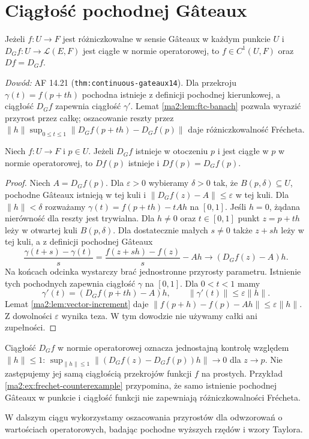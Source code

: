 \section{Ciągłość pochodnej Gâteaux}

\begin{twierdzenie}
\label{ma2:thm:continuous-gateaux}
Jeżeli $f:U\to F$ jest różniczkowalne w sensie
Gâteaux w każdym punkcie $U$ i
$D_Gf:U\to\mathcal L(E,F)$ jest ciągłe w normie
operatorowej, to $f\in C^1(U,F)$ oraz $Df=D_Gf$.
\end{twierdzenie}
\emph{Dowód:} AF 14.21 (\texttt{thm:continuous-gateaux14}).
Dla przekroju $\gamma(t)=f(p+th)$ pochodna istnieje
z definicji pochodnej kierunkowej, a ciągłość
$D_Gf$ zapewnia ciągłość $\gamma'$.
Lemat \ref{ma2:lem:ftc-banach} pozwala wyrazić
przyrost przez całkę; oszacowanie reszty przez
$\|h\|\sup_{0\le t\le1}\|D_Gf(p+th)-D_Gf(p)\|$
daje różniczkowalność Frécheta.

\begin{wniosek}
\label{ma2:cor:pointwise-gateaux}
Niech $f:U\to F$ i $p\in U$.
Jeżeli $D_Gf$ istnieje w otoczeniu $p$ i jest
ciągłe w $p$ w normie operatorowej, to $Df(p)$
istnieje i $Df(p)=D_Gf(p)$.
\end{wniosek}
\begin{proof}
Niech $A=D_Gf(p)$. Dla $\varepsilon>0$ wybieramy
$\delta>0$ tak, że $B(p,\delta)\subseteq U$,
pochodne Gâteaux istnieją w tej kuli i
$\|D_Gf(z)-A\|\le\varepsilon$ w tej kuli.
Dla $\|h\|<\delta$ rozważamy
$\gamma(t)=f(p+th)-tAh$ na $[0,1]$.
Jeśli $h=0$, żądana nierówność dla reszty jest
trywialna. Dla $h\ne0$ oraz $t\in[0,1]$ punkt
$z=p+th$ leży w otwartej kuli $B(p,\delta)$.
Dla dostatecznie małych $s\ne0$ także $z+sh$
leży w tej kuli, a z definicji pochodnej Gâteaux
\[
 \frac{\gamma(t+s)-\gamma(t)}{s}
 =\frac{f(z+sh)-f(z)}{s}-Ah
 \longrightarrow (D_Gf(z)-A)h.
\]
Na końcach odcinka wystarczy brać jednostronne
przyrosty parametru. Istnienie tych pochodnych
zapewnia ciągłość $\gamma$ na $[0,1]$.
Dla $0<t<1$ mamy
\[
 \gamma'(t)=(D_Gf(p+th)-A)h,\qquad
 \|\gamma'(t)\|\le\varepsilon\|h\|.
\]
Lemat \ref{ma2:lem:vector-increment} daje
$\|f(p+h)-f(p)-Ah\|\le\varepsilon\|h\|$.
Z dowolności $\varepsilon$ wynika teza. W tym
dowodzie nie używamy całki ani zupełności.
\end{proof}

Ciągłość $D_Gf$ w normie operatorowej oznacza
jednostajną kontrolę względem $\|h\|\le1$:
$\sup_{\|h\|\le1}\|(D_Gf(z)-D_Gf(p))h\|\to0$
dla $z\to p$. Nie zastępujemy jej samą ciągłością
przekrojów funkcji $f$ na prostych. Przykład
\ref{ma2:ex:frechet-counterexample} przypomina, że
samo istnienie pochodnej Gâteaux w punkcie i
ciągłość funkcji nie zapewniają różniczkowalności
Frécheta.

W dalszym ciągu wykorzystamy oszacowania przyrostów
dla odwzorowań o wartościach operatorowych, badając
pochodne wyższych rzędów i wzory Taylora.
